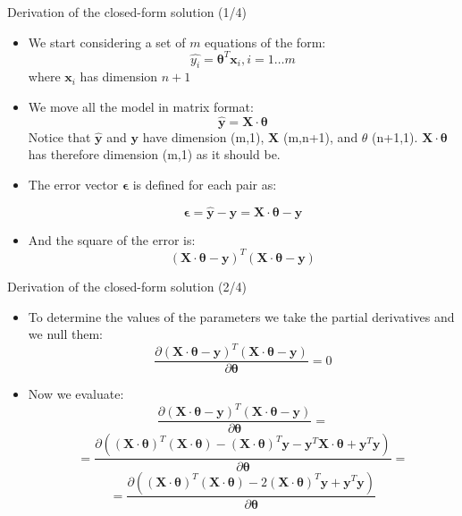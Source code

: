 \documentclass{beamer}
\begin{document}
\begin{frame}
{\centerline{Derivation of the closed-form solution  (1/4) }}

\begin{itemize}
\item We start considering a set of $m$ equations of the form:
$$ \hat{y_i} = \boldsymbol \theta^T \boldsymbol x_i, i=1\ldots m$$
\subitem  where $\boldsymbol x_i$ has dimension $n+1$
\item We move all the model in matrix format:
$$  \hat{\boldsymbol y} = \boldsymbol X \cdot \boldsymbol \theta   $$
\subitem Notice that $\hat{\boldsymbol y}$ and $\boldsymbol y$ have dimension (m,1), $\boldsymbol X$ (m,n+1), and $\theta$  (n+1,1). $\boldsymbol X \cdot \boldsymbol \theta$ has therefore dimension (m,1) as it should be.

\item The error vector $ {\boldsymbol \epsilon}$ is defined for each pair as:

$$ {\boldsymbol \epsilon} = \hat{\boldsymbol y} - \boldsymbol y = \boldsymbol X \cdot \boldsymbol \theta - {\boldsymbol y} $$

\item And the square of the error is:
$$  (\boldsymbol X \cdot \boldsymbol \theta - \boldsymbol y)^T (\boldsymbol X \cdot \boldsymbol \theta - \boldsymbol y) $$

\end{itemize}

\end{frame}

\begin{frame}
{\centerline{Derivation of the closed-form solution  (2/4) }}

\begin{itemize}
\item To determine the values of the parameters we take the partial derivatives and we null them:
$$ \frac{ \partial  (\boldsymbol X \cdot \boldsymbol \theta - \boldsymbol y)^T (\boldsymbol X \cdot \boldsymbol \theta - \boldsymbol y)} { \partial \boldsymbol \theta} = 0 $$
\item Now we evaluate:
$$ \frac{ \partial  (\boldsymbol X \cdot \boldsymbol \theta - \boldsymbol y)^T (\boldsymbol X \cdot \boldsymbol \theta - \boldsymbol y)} { \partial \boldsymbol \theta} = $$
 $$ = \frac{\partial (
 (\boldsymbol X \cdot \boldsymbol \theta)^T (\boldsymbol X \cdot \boldsymbol \theta) -
 (\boldsymbol X \cdot \boldsymbol \theta)^T \boldsymbol y -
 \boldsymbol y^T\boldsymbol X \cdot \boldsymbol \theta +
  \boldsymbol y^T \boldsymbol y
 )}
 { \partial \boldsymbol \theta} = $$
  $$ = \frac{\partial (
 (\boldsymbol X \cdot \boldsymbol \theta)^T (\boldsymbol X \cdot \boldsymbol \theta) -
 2 (\boldsymbol X \cdot \boldsymbol \theta)^T \boldsymbol y +
  \boldsymbol y^T \boldsymbol y
 )}
 { \partial \boldsymbol \theta} $$

\end{itemize}

\end{frame}
\end{document}
